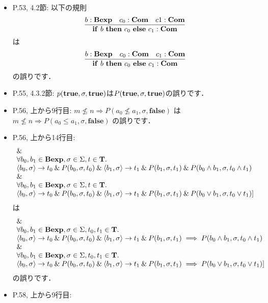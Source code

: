 \documentclass[12pt,titlepage,twoside,openright,dvipdfmx]{jsbook}
\theoremstyle{definition}
\begin{document}
\begin{itemize}
  \item P.53, 4.2節: 以下の規則
  \[
    \infer
    {\mathbf{if}\ b\ \mathbf{then}\ c_0\ \mathbf{else}\ c_1:\mathbf{Com}}
    {b:\mathbf{Bexp} & c_0:\mathbf{Com} & c1:\mathbf{Com}}
  \]
  は
  \[
    \infer
    {\mathbf{if}\ b\ \mathbf{then}\ c_0\ \mathbf{else}\ c_1:\mathbf{Com}}
    {b:\mathbf{Bexp} & c_0:\mathbf{Com} & c_1:\mathbf{Com}}
  \]
  の誤りです．
\item P.55, 4.3.2節: $p(\mathbf{true}, \sigma,\mathbf{true})$は$P(\mathbf{true}, \sigma, \mathbf{true})$の誤りです．
\item P.56, 上から9行目:
  $m \not\le n \Rightarrow P(a_0 \not\le a_1,\sigma,\mathbf{false})$
  は
  $m \not\le n \Rightarrow P(a_0 \le a_1,\sigma,\mathbf{false})$
  の誤りです．
\item P.56, 上から14行目:
  \[
    \begin{array}{ll}
    \mathbin{\&}\\
    \forall{b_0,b_1\in\mathbf{Bexp},\sigma\in\Sigma,t\in\mathbf{T}}.\\
      \langle{b_0,\sigma}\rangle\rightarrow t_0 \mathbin{\&} P(b_0,\sigma,t_0) \mathbin{\&} \langle{b_1,\sigma}\rangle\rightarrow t_1 \mathbin{\&} P(b_1,\sigma,t_1) \mathbin{\&} P(b_0\wedge b_1,\sigma, t_0\wedge t_1)\\
      \mathbin{\&}\\
      \forall{b_0,b_1\in\mathbf{Bexp},\sigma\in\Sigma,t\in\mathbf{T}}.\\
      \langle{b_0,\sigma}\rangle\rightarrow t_0 \mathbin{\&} P(b_0,\sigma,t_0) \mathbin{\&} \langle{b_1,\sigma}\rangle\rightarrow t_1 \mathbin{\&} P(b_1,\sigma,t_1) \mathbin{\&} P(b_0\vee b_1,\sigma, t_0\vee t_1) \rbrack
    \end{array}
  \]
  は
  \[
    \begin{array}{ll}
    \mathbin{\&}\\
      \forall{b_0,b_1\in\mathbf{Bexp},\sigma\in\Sigma,t_0,t_1\in\mathbf{T}}.\\
      \langle{b_0,\sigma}\rangle\rightarrow t_0 \mathbin{\&} P(b_0,\sigma,t_0) \mathbin{\&} \langle{b_1,\sigma}\rangle\rightarrow t_1 \mathbin{\&} P(b_1,\sigma,t_1) \implies P(b_0\wedge b_1,\sigma, t_0\wedge t_1)\\
      \mathbin{\&}\\
      \forall{b_0,b_1\in\mathbf{Bexp},\sigma\in\Sigma,t_0,t_1\in\mathbf{T}}.\\
      \langle{b_0,\sigma}\rangle\rightarrow t_0 \mathbin{\&} P(b_0,\sigma,t_0) \mathbin{\&} \langle{b_1,\sigma}\rangle\rightarrow t_1 \mathbin{\&} P(b_1,\sigma,t_1) \implies P(b_0\vee b_1,\sigma, t_0\vee t_1) \rbrack
    \end{array}
  \]
  の誤りです．
\item P.58, 上から9行目:

\end{itemize}
\end{document}
